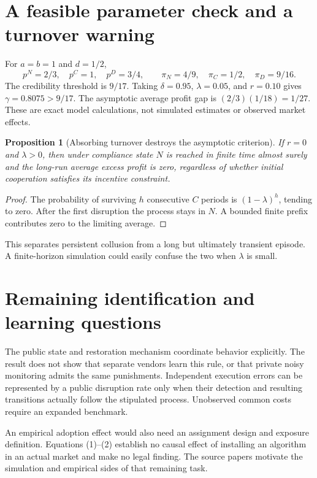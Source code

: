 \documentclass[11pt,a4paper]{article}
\newtheorem{proposition}[theorem]{Proposition}
\theoremstyle{remark}
\begin{document}
\section{A feasible parameter check and a turnover warning}
For $a=b=1$ and $d=1/2$,
\[
 p^N=2/3,\quad p^C=1,\quad p^D=3/4,
 \qquad\pi_N=4/9,\quad\pi_C=1/2,\quad\pi_D=9/16.
\]
The credibility threshold is $9/17$. Taking $\delta=0.95$, $\lambda=0.05$, and $r=0.10$ gives $\gamma=0.8075>9/17$. The asymptotic average profit gap is $(2/3)(1/18)=1/27$. These are exact model calculations, not simulated estimates or observed market effects.

\begin{proposition}[Absorbing turnover destroys the asymptotic criterion]
If $r=0$ and $\lambda>0$, then under compliance state $N$ is reached in finite time almost surely and the long-run average excess profit is zero, regardless of whether initial cooperation satisfies its incentive constraint.
\end{proposition}
\begin{proof}
The probability of surviving $h$ consecutive $C$ periods is $(1-\lambda)^h$, tending to zero. After the first disruption the process stays in $N$. A bounded finite prefix contributes zero to the limiting average.
\end{proof}
This separates persistent collusion from a long but ultimately transient episode. A finite-horizon simulation could easily confuse the two when $\lambda$ is small.

\section{Remaining identification and learning questions}
The public state and restoration mechanism coordinate behavior explicitly. The result does not show that separate vendors learn this rule, or that private noisy monitoring admits the same punishments. Independent execution errors can be represented by a public disruption rate only when their detection and resulting transitions actually follow the stipulated process. Unobserved common costs require an expanded benchmark.

An empirical adoption effect would also need an assignment design and exposure definition. Equations (1)--(2) establish no causal effect of installing an algorithm in an actual market and make no legal finding. The source papers \cite{Calvano,Assad} motivate the simulation and empirical sides of that remaining task.
\end{document}
